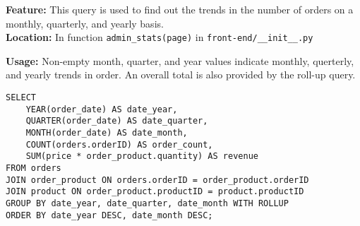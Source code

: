 \textbf{Feature:} This query is used to find out the trends in the number of orders on a monthly, quarterly, and yearly basis. \\
\textbf{Location:} In function \texttt{admin\_stats(page)} in \texttt{front-end/\_\_init\_\_.py}

\textbf{Usage:}
Non-empty month, quarter, and year values indicate monthly, querterly, and yearly trends in order.
An overall total is also provided by the roll-up query.

\begin{lstlisting}
SELECT
    YEAR(order_date) AS date_year,
    QUARTER(order_date) AS date_quarter,
    MONTH(order_date) AS date_month,
    COUNT(orders.orderID) AS order_count,
    SUM(price * order_product.quantity) AS revenue
FROM orders
JOIN order_product ON orders.orderID = order_product.orderID
JOIN product ON order_product.productID = product.productID
GROUP BY date_year, date_quarter, date_month WITH ROLLUP
ORDER BY date_year DESC, date_month DESC;
\end{lstlisting}